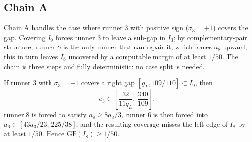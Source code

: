 \documentclass[12pt]{article}
\begin{document}
\subsection{Chain A}

Chain A handles the case where runner 3 with positive sign ($\sigma_3=+1$) covers the gap. Covering $I_9$
forces runner 3 to leave a sub-gap in $I_3$; by complementary-pair structure, runner 8 is
the only runner that can repair it, which forces $a_8$ upward; this in turn leaves $I_8$
uncovered by a computable margin of at least $1/50$. The chain is three steps and fully
deterministic: no case split is needed.

\begin{lemma}[Chain A]\label{l:53}
If runner 3 with $\sigma_3=+1$ covers a right gap
$[g_L,109/110]\subset I_9$, then
\[
a_3 \in \left[\frac{32}{11g_L},\,\frac{340}{109}\right],
\]
runner 8 is forced to satisfy $a_8\ge 8a_3/3$, runner 6 is then forced into
$a_6\in[43a_3/23,\,225/38]$, and the resulting coverage misses the left edge of $I_8$ by
at least $1/50$. Hence $\mathrm{GF}(I_8)\ge 1/50$.

\end{lemma}
\end{document}
